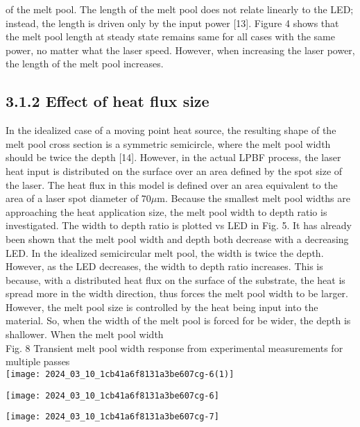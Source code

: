 \documentclass[10pt]{article}
\begin{document}
of the melt pool. The length of the melt pool does not relate linearly to the LED; instead, the length is driven only by the input power [13]. Figure 4 shows that the melt pool length at steady state remains same for all cases with the same power, no matter what the laser speed. However, when increasing the laser power, the length of the melt pool increases.

\subsection*{3.1.2 Effect of heat flux size}
In the idealized case of a moving point heat source, the resulting shape of the melt pool cross section is a symmetric semicircle, where the melt pool width should be twice the depth [14]. However, in the actual LPBF process, the laser heat input is distributed on the surface over an area defined by the spot size of the laser. The heat flux in this model is defined over an area equivalent to the area of a laser spot diameter of $70 \mu \mathrm{m}$. Because the smallest melt pool widths are approaching the heat application size, the melt pool width to depth ratio is investigated. The width to depth ratio is plotted vs LED in Fig. 5. It has already been shown that the melt pool width and depth both decrease with a decreasing LED. In the idealized semicircular melt pool, the width is twice the depth. However, as the LED decreases, the width to depth ratio increases. This is because, with a distributed heat flux on the surface of the substrate, the heat is spread more in the width direction, thus forces the melt pool width to be larger. However, the melt pool size is controlled by the heat being input into the material. So, when the width of the melt pool is forced for be wider, the depth is shallower. When the melt pool width\\
Fig. 8 Transient melt pool width response from experimental measurements for multiple passes\\
\texttt{[image: 2024\_03\_10\_1cb41a6f8131a3be607cg-6(1)]}

\begin{center}
\texttt{[image: 2024\_03\_10\_1cb41a6f8131a3be607cg-6]}
\end{center}

\begin{center}
\texttt{[image: 2024\_03\_10\_1cb41a6f8131a3be607cg-7]}
\end{center}
\end{document}
